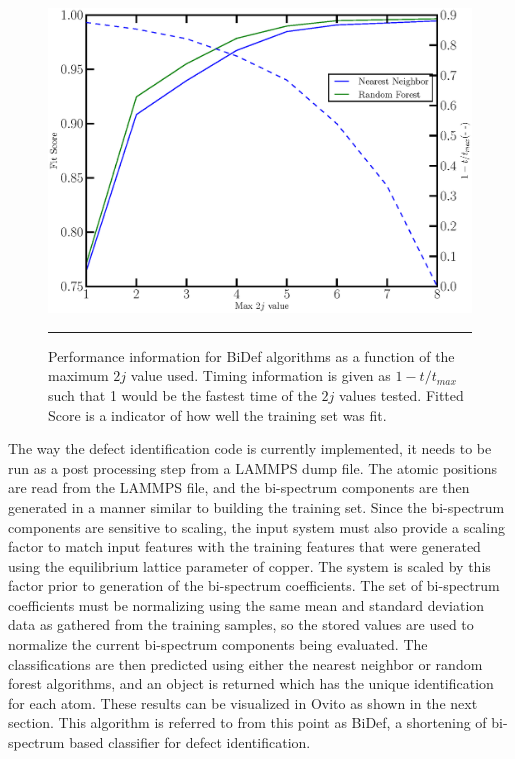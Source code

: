 \documentclass[12pt]{iopart}
\begin{document}
\begin{figure}[htbp]
  \centering
    \includegraphics[scale=0.5]{Figures/performance.eps}
    \rule{35em}{0.5pt}
  \caption[]{Performance information for BiDef algorithms as a function of the maximum $2j$ value used. Timing information is given as $1-t/t_{max}$ such that 1 would be the fastest time of the $2j$ values tested. Fitted Score is a indicator of how well the training set was fit.}
  \label{fig:performance}
\end{figure}

The way the defect identification code is currently implemented, it needs to be run as a post processing step from a LAMMPS dump file. The atomic positions are read from the LAMMPS file, and the bi-spectrum components are then generated in a manner similar to building the training set. Since the bi-spectrum components are sensitive to scaling, the input system must also provide a scaling factor to match input features with the training features that were generated using the equilibrium lattice parameter of copper. The system is scaled by this factor prior to generation of the bi-spectrum coefficients. The set of bi-spectrum coefficients must be normalizing using the same mean and standard deviation data as gathered from the training samples, so the stored values are used to normalize the current bi-spectrum components being evaluated. The classifications are then predicted using either the nearest neighbor or random forest algorithms, and an object is returned which has the unique identification for each atom. These results can be visualized in Ovito\cite{Stukowski2010} as shown in the next section. This algorithm is referred to from this point as BiDef, a shortening of bi-spectrum based classifier for defect identification.
\end{document}
